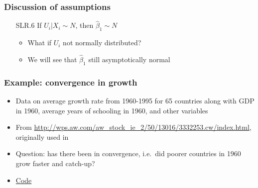 \begin{frame}[allowframebreaks]
  \frametitle{Discussion of assumptions}
  \begin{itemize}
  \item[SLR.6] If $U_i|X_i \sim N$, then $\hat{\beta}_1 \sim N$
    \begin{itemize}
    \item What if $U_i$ not normally distributed?
    \item We will see that $\hat{\beta}_1$ still asymptotically normal
    \end{itemize}
  \end{itemize}
\end{frame}








\begin{frame}\frametitle{Example: convergence in growth}
  \begin{itemize}
  \item Data on average growth rate from 1960-1995 for 65 countries
    along with GDP in 1960, average years of schooling in 1960, and
    other variables
  \item From
    \url{http://wps.aw.com/aw_stock_ie_2/50/13016/3332253.cw/index.html},
    originally used in \cite{beck2000}
  \item Question: has there been in convergence, i.e.\ did poorer
    countries in 1960 grow faster and catch-up?    
  \item \href{https://bitbucket.org/paulschrimpf/econ326/src/master/notes/03/growth.R?at=master} {Code}
  \end{itemize}
\end{frame}

